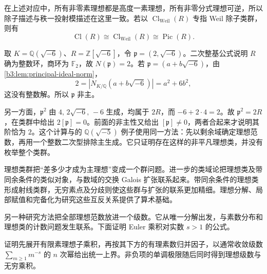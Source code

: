 在上述对应中，所有非零素理想都是高度一素理想，所有非零分式理想可逆，所以除子描述与秩一投射模描述在这里一致。若以 \(\operatorname{Cl}_{\mathrm{Weil}}(R)\) 专指 Weil 除子类群，则有
\[
	\operatorname{Cl}(R)\cong\operatorname{Cl}_{\mathrm{Weil}}(R)\cong\operatorname{Pic}(R).
\]

\begin{example}\label{b3:exm:nonprincipal-ideal-minus-six}
	取 \(K=\mathbb Q(\sqrt{-6})\)、\(R=\mathbb Z[\sqrt{-6}]\)，令 \(\mathfrak p=(2,\sqrt{-6})\)。二次整基公式说明 \(R\) 确为整数环，商环为 \(\mathbb F_2\)，故 \(N(\mathfrak p)=2\)。若 \(\mathfrak p=(a+b\sqrt{-6})\)，由\cref{b3:lem:principal-ideal-norm}，
	\[
		2=|N_{K/\mathbb Q}(a+b\sqrt{-6})|=a^2+6b^2,
	\]
	这没有整数解。所以 \(\mathfrak p\) 非主。

	\ProseParagraphBreak
	另一方面，\(\mathfrak p^2\) 由 \(4,\,2\sqrt{-6},\,-6\) 生成，均属于 \(2R\)，而 \(-6+2\cdot4=2\)。故 \(\mathfrak p^2=2R\)，在类群中给出 \(2[\mathfrak p]=0\)。前面的非主性又给出 \([\mathfrak p]\ne0\)，两者合起来才说明其阶恰为 \(2\)。这个计算与的 \(\mathbb Q(\sqrt{-5})\) 例子使用同一方法：先以剩余域确定理想范数，再用一个整数二次型排除主生成。它只证明存在这样的非平凡理想类，并没有枚举整个类群。
\end{example}

理想类群把“差多少才成为主理想”变成一个群问题。进一步的类域论把理想类及带同余条件的类似对象，与数域的交换 Galois 扩张联系起来。带同余条件的理想类形成射线类群，无穷素点及分歧则使这些群与扩张的联系更加精细。理想分解、局部赋值和完备化为研究这些互反关系提供了算术基础。

\ProseParagraphBreak
另一种研究方法把全部理想范数放进一个级数。它从唯一分解出发，与素数分布和理想类的计数问题发生联系。下面证明 Euler 乘积对实数 \(s>1\) 的公式。

证明先展开有限素理想子乘积，再按其下方的有理素数归并因子，以通常收敛级数 \(\sum_{m\ge1}m^{-s}\) 的 \(n\) 次幂给出统一上界。非负项的单调极限随后同时得到理想级数与无穷乘积。

